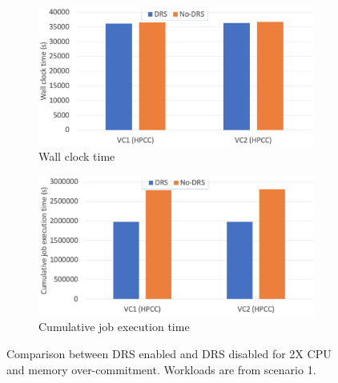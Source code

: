 \begin{figure}
     \centering
     \begin{subfigure}[b]{0.4\textwidth}
         \centering
         \includegraphics[width=\textwidth]{Figures/memory_wct_1.pdf}
         \caption{Wall clock time}
         \label{fig:memory_wct_1}
     \end{subfigure}
     \hfill
     \begin{subfigure}[b]{0.4\textwidth}
         \centering
         \includegraphics[width=\textwidth]{Figures/memory_cjet_1.pdf}
         \caption{Cumulative job execution time}
         \label{fig:memory_cjet_1}
     \end{subfigure}
     \caption{Comparison between DRS enabled and DRS disabled for 2X CPU and memory over-commitment. Workloads are from scenario 1. }
     \label{fig:memory_scenario_1}
\end{figure}

